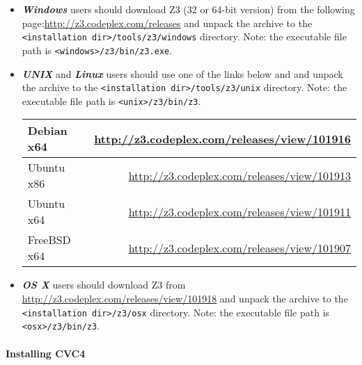 \documentclass[oneside,final,12pt]{extreport}
\begin{document}
\begin{itemize}
\item \textbf{\textit{Windows}} users should download Z3 (32 or 64-bit version) from the following
       page:\url{http://z3.codeplex.com/releases} and unpack the archive to the
      \texttt{<installation dir>/tools/z3/windows} directory. Note: the executable file path
      is \texttt{<windows>/z3/bin/z3.exe}.

\item \textbf{\textit{UNIX}} and \textbf{\textit{Linux}} users should use one of the links below
      and and unpack the archive to the \texttt{<installation dir>/tools/z3/unix} directory.
      Note: the executable file path is \texttt{<unix>/z3/bin/z3}.

      \begin{tabular} {| l | r |} \hline
      Debian  x64 & \url{http://z3.codeplex.com/releases/view/101916} \\ \hline
      Ubuntu  x86 & \url{http://z3.codeplex.com/releases/view/101913} \\ \hline
      Ubuntu  x64 & \url{http://z3.codeplex.com/releases/view/101911} \\ \hline
      FreeBSD x64 & \url{http://z3.codeplex.com/releases/view/101907} \\ \hline
      \end{tabular}

\item \textbf{\textit{OS X}} users should download Z3 from
      \url{http://z3.codeplex.com/releases/view/101918} and unpack the archive to the
      \texttt{<installation dir>/z3/osx} directory. Note: the executable file path is
      \texttt{<osx>/z3/bin/z3}.

\end{itemize}

\paragraph{Installing CVC4}
\end{document}
